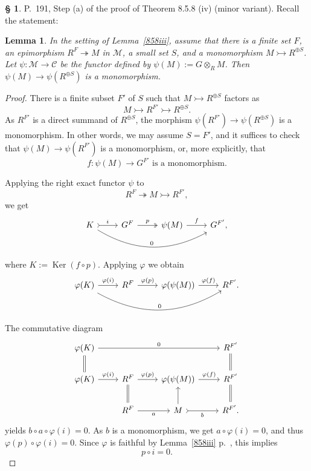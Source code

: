\documentclass[12pt]{article}%
\newtheorem{lem}[thm]{Lemma}
\theoremstyle{remark}
\theoremstyle{definition}
\newtheorem{s}[thm]{\S}%
\newcommand{\C}{\mathcal C}
\newcommand{\M}{\mathcal M}
\newcommand{\pp}{\varphi}
\newcommand{\epi}{\twoheadrightarrow}
\DeclareMathOperator{\Ker}{Ker}
\begin{document}
\begin{s} 
P.~191, Step (a) of the proof of Theorem 8.5.8 (iv) (minor variant). Recall the statement: 

\begin{lem}
In the setting of Lemma~\ref{858iii}, assume that there is a finite set $F$, an epimorphism $R^F\epi M$ in $\M$, a small set $S$, and a monomorphism $M\rightarrowtail R^{\oplus S}$. Let $\psi:\M\to\C$ be the functor defined by $\psi(M):=G\otimes_RM$. Then $\psi(M)\to\psi(R^{\oplus S})$ is a monomorphism. 
\end{lem}

\begin{proof}
There is a finite subset $F'$ of $S$ such that $M\rightarrowtail R^{\oplus S}$ factors as 
$$
M\rightarrowtail R^{F'}\rightarrowtail R^{\oplus S}.
$$ 
As $R^{F'}$ is a direct summand of $R^{\oplus S}$, the morphism $\psi(R^{F'})\to\psi(R^{\oplus S})$ is a monomorphism. In other words, we may assume $S=F'$, and it suffices to check that $\psi(M)\to\psi(R^{F'})$ is a monomorphism, or, more explicitly, that 
%
\begin{equation}\label{fpsi}
f:\psi(M)\to G^{F'}\text{ is a monomorphism.}
\end{equation}

Applying the right exact functor $\psi$ to 
$$
R^F\epi M\rightarrowtail R^{F'},
$$
we get 
$$
\begin{tikzcd}
K\ar[tail]{r}{i}\ar[bend right]{rrr}{0}&G^F\ar[two heads]{r}{p}&\psi(M)\ar{r}{f}&G^{F'},
\end{tikzcd}
$$
where $K:=\Ker(f\circ p)$. Applying $\pp$ we obtain
$$
\begin{tikzcd}
\pp(K)\ar{r}{\pp(i)}\ar[bend right]{rrr}{0}&R^F\ar{r}{\pp(p)}&\pp(\psi(M))\ar{r}{\pp(f)}&R^{F'}.
\end{tikzcd}
$$
The commutative diagram
$$
\begin{tikzcd}
\pp(K)\ar[equal]{d}\ar{rrr}{0}&&&R^{F'}\ar[equal]{d}\\
\pp(K)\ar{r}{\pp(i)}&R^F\ar[equal]{d}\ar{r}{\pp(p)}&\pp(\psi(M))\ar{r}{\pp(f)}&R^{F'}\ar[equal]{d}\\
&R^F\ar{r}[swap]{a}&M\ar[tail]{r}[swap]{b}\ar{u}&R^{F'}.
\end{tikzcd}
$$ 
yields $b\circ a\circ\pp(i)=0$. As $b$ is a monomorphism, we get $a\circ\pp(i)=0$, and thus $\pp(p)\circ\pp(i)=0$. Since $\pp$ is faithful by Lemma~\ref{858iii} p.~\pageref{858iii}, this implies 
%
\begin{equation}\label{pi=0}
p\circ i=0.
\end{equation} 


\end{proof}
\end{s}
\end{document}
